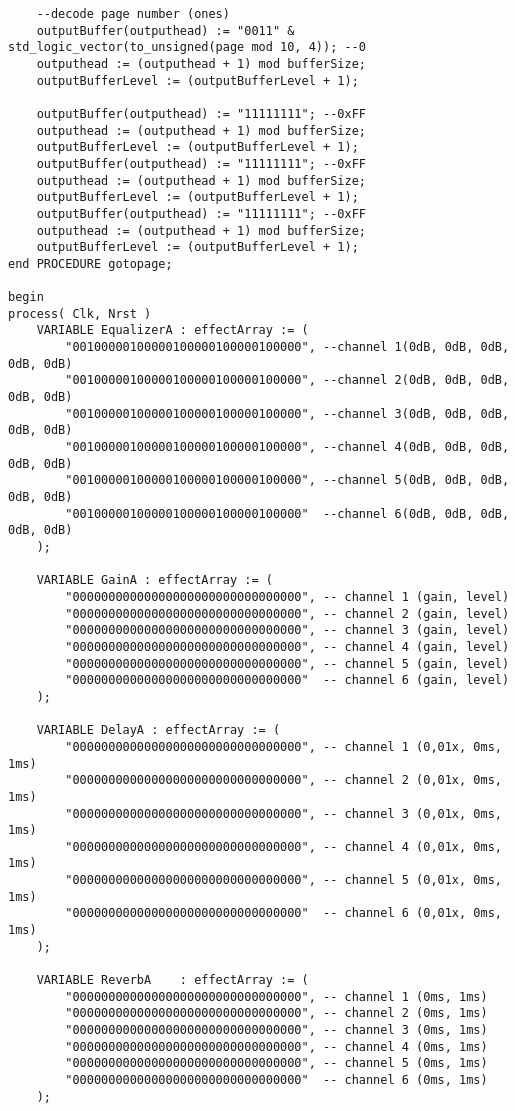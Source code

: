 \begin{lstlisting}
	--decode page number (ones)
	outputBuffer(outputhead) := "0011" & std_logic_vector(to_unsigned(page mod 10, 4)); --0
	outputhead := (outputhead + 1) mod bufferSize;
	outputBufferLevel := (outputBufferLevel + 1);

	outputBuffer(outputhead) := "11111111"; --0xFF
	outputhead := (outputhead + 1) mod bufferSize;
	outputBufferLevel := (outputBufferLevel + 1);
	outputBuffer(outputhead) := "11111111"; --0xFF
	outputhead := (outputhead + 1) mod bufferSize;
	outputBufferLevel := (outputBufferLevel + 1);
	outputBuffer(outputhead) := "11111111"; --0xFF
	outputhead := (outputhead + 1) mod bufferSize;
	outputBufferLevel := (outputBufferLevel + 1);
end PROCEDURE gotopage;

begin
process( Clk, Nrst )
	VARIABLE EqualizerA : effectArray := (
		"00100000100000100000100000100000", --channel 1(0dB, 0dB, 0dB, 0dB, 0dB)
		"00100000100000100000100000100000", --channel 2(0dB, 0dB, 0dB, 0dB, 0dB) 
		"00100000100000100000100000100000", --channel 3(0dB, 0dB, 0dB, 0dB, 0dB)
		"00100000100000100000100000100000", --channel 4(0dB, 0dB, 0dB, 0dB, 0dB)
		"00100000100000100000100000100000", --channel 5(0dB, 0dB, 0dB, 0dB, 0dB)
		"00100000100000100000100000100000"  --channel 6(0dB, 0dB, 0dB, 0dB, 0dB)
	);

	VARIABLE GainA : effectArray := (
		"00000000000000000000000000000000", -- channel 1 (gain, level)
		"00000000000000000000000000000000", -- channel 2 (gain, level)
		"00000000000000000000000000000000", -- channel 3 (gain, level)
		"00000000000000000000000000000000", -- channel 4 (gain, level)
		"00000000000000000000000000000000", -- channel 5 (gain, level)
		"00000000000000000000000000000000"  -- channel 6 (gain, level)
	);

	VARIABLE DelayA	: effectArray := (
		"00000000000000000000000000000000", -- channel 1 (0,01x, 0ms, 1ms)
		"00000000000000000000000000000000", -- channel 2 (0,01x, 0ms, 1ms)
		"00000000000000000000000000000000", -- channel 3 (0,01x, 0ms, 1ms)
		"00000000000000000000000000000000", -- channel 4 (0,01x, 0ms, 1ms)
		"00000000000000000000000000000000", -- channel 5 (0,01x, 0ms, 1ms)
		"00000000000000000000000000000000"  -- channel 6 (0,01x, 0ms, 1ms)
	);

	VARIABLE ReverbA	: effectArray := (
		"00000000000000000000000000000000", -- channel 1 (0ms, 1ms)
		"00000000000000000000000000000000", -- channel 2 (0ms, 1ms)
		"00000000000000000000000000000000", -- channel 3 (0ms, 1ms)
		"00000000000000000000000000000000", -- channel 4 (0ms, 1ms)
		"00000000000000000000000000000000", -- channel 5 (0ms, 1ms)
		"00000000000000000000000000000000"  -- channel 6 (0ms, 1ms)
	);


\end{lstlisting}
